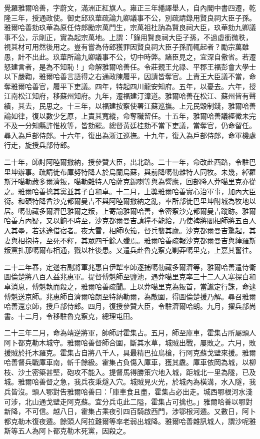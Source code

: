 \begin{pinyinscope}
覺羅雅爾哈善，字蔚文，滿洲正紅旗人。雍正三年繙譯舉人，自內閣中書四遷，乾隆三年，授通政使。御史邱玖華疏論九卿議事不公，別疏請錄用賢良祠大臣子孫。雅爾哈善劾玖華為原任侍郎勵宗萬門生，宗萬祖杜訥為賢良祠大臣，玖華劾九卿議事不公，示剛正，實為起宗萬地。上謂：「錄用賢良祠大臣子孫，不過虛銜微秩，視其材可用然後用之。豈有嘗為侍郎獲罪因賢良祠大臣子孫而輒起者？勵宗萬雖愚，計不出此。玖華所論九卿議事不公，切中時弊。諸臣見之，宜深自儆省。若遷怒建言者，是為不知恥！」命解雅爾哈善任。令莊親王允祿、平郡王福彭會大學士以下嚴鞫，雅爾哈善言語得之右通政陳履平，因請皆奪官。上責王大臣議不當，命奪雅爾哈善官，履平下吏議。四年，特起四川龍安知府。五年，以憂去。六年，授江南松江知府，移蘇州知府。九年，遷福建汀漳道。雅爾哈善在松江、蘇州皆有聲績，其去，民思之。十三年，以福建按察使署江蘇巡撫。上元民毀制錢，雅爾哈善論如律，復以數少乞原，上責其寬縱，命奪職留任。十五年，雅爾哈善議經徵未完不及一分知縣許惟枚等，皆劾罷。總督黃廷桂劾不當下吏議，當奪官，仍命留任。尋入為戶部侍郎。十六年，復出為浙江巡撫。十九年，復入為戶部侍郎，命軍機處行走，旋授兵部侍郎。

二十年，師討阿睦爾撒納，授參贊大臣，出北路。二十一年，命改赴西路，令駐巴里坤辦事。疏請徙布庫努特降人於烏蘭烏蘇，與前降噶勒雜特人同牧。未幾，綽羅斯汗噶勒藏多爾濟叛，噶勒雜特人哈薩克錫喇等與為響應，回部降人莽噶里克亦從之。雅爾哈善擒其黨並其子白和卓。十二月，上獎雅爾哈善實心治軍事，加內大臣銜。和碩特降酋沙克都爾曼吉不與阿睦爾撒納之亂，率所部徙巴里坤附城為牧地以居。噶勒藏多爾濟巴雅爾之叛，上寄諭雅爾哈善，令密察沙克都爾曼吉蹤跡。雅爾哈善方內疑，又以餉不時至，沙克都爾曼吉請糧不能給，乃使裨將閻相師將五百人入其壘，若迷途借宿者。夜大雪，相師吹笳，督兵襲其廬。沙克都爾曼吉驚起，其妻與相抱持，至死不釋，其眾四千餘人殲焉。雅爾哈善疏報沙克都爾曼吉與綽羅斯叛黨扎那噶爾布相通，戮以杜後患。又遣兵赴魯克察克剿莽噶里克，上嘉其奮往。

二十二年春，定邊右副將軍兆惠自伊犁率師逐捕噶勒藏多爾濟等，雅爾哈善遣侍衛圖倫楚將八百人益兆惠軍。提督傅魁師至鹽池，遇莽噶里克率三十二人入塞探白和卓消息，傅魁執而殺之，雅爾哈善疏聞。上以莽噶里克為叛首，當讞定行誅，命逮傅魁送京師。兆惠師自濟爾哈朗至特納勒爾，為敵圍，得圖倫楚援乃解。尋召雅爾哈善還京師，授戶部侍郎。四月，復授參贊大臣，令駐濟爾哈朗。九月，擢兵部尚書。十二月，令移駐魯克察克，總理屯田。

二十三年二月，命為靖逆將軍，帥師討霍集占。五月，師至庫車，霍集占所屬頭人阿卜都克勒木城守。雅爾哈善督師合圍，斷其水草，城賊出戰，屢敗之。六月，敗援賊於托木羅克。霍集占自將八千人，具最精巴拉鳥槍，行阿克蘇戈壁來援。雅爾哈善督兵戰庫車南，斬千餘級。霍集占負傷入庫車，獲其纛。庫車依岡為城，以柳枝、沙土密築甚堅，砲攻不能入。提督馬得勝策穴地入城，距城北一里為隧，已及城。雅爾哈善督之急，我兵夜秉燧入穴。城賊見火光，於城內為橫溝，水入隧，我兵皆沒。頭人鄂對告雅爾哈善曰：「庫車食且盡，霍集占必出走。城西鄂根河水淺可涉，北山通戈壁走阿克蘇。宜分兵屯此二隘，霍集占可擒也。」雅爾哈善以鄂對新降，不可信。越八日，霍集占乘夜引四百騎啟西門，涉鄂根河遁。又數日，阿卜都克勒木復夜遁。餘頭人阿拉難爾等率老弱出城降。雅爾哈善雜訊城人，謂沙呢雅斯等五人為阿卜都克勒木死黨，因殺之。


\end{pinyinscope}
